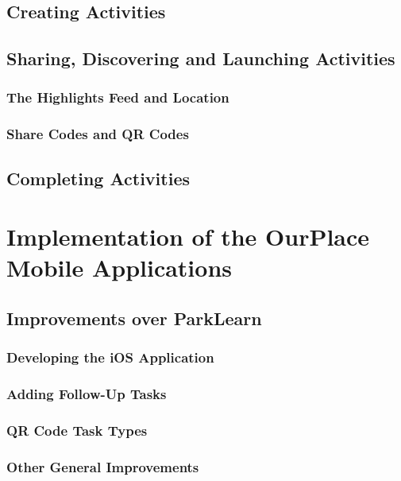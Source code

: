 \subsection{Creating Activities}

\subsection{Sharing, Discovering and Launching Activities}

\subsubsection{The Highlights Feed and Location}

\subsubsection{Share Codes and QR Codes}

\subsection{Completing Activities}

\section{Implementation of the OurPlace Mobile Applications}
\label{sec:ImplementationMobile}

\subsection{Improvements over ParkLearn}

\subsubsection{Developing the iOS Application}

\subsubsection{Adding Follow-Up Tasks}

\subsubsection{QR Code Task Types}

\subsubsection{Other General Improvements}


